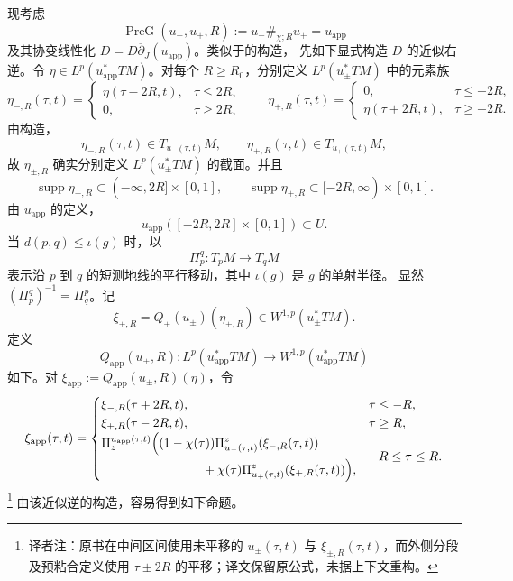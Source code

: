 现考虑\termPreGluingMap{}
\[
 \operatorname{PreG}(u_-,u_+,R):=u_-\#_{\chi;R}u_+=u_{\mathrm{app}}
\]
及其协变线性化 $D=D\overline\partial_J(u_{\mathrm{app}})$。类似于\termApproximateSolution{}的构造，
先如下显式构造 $D$ 的近似右逆。令
$\eta\in L^p(u_{\mathrm{app}}^*TM)$。对每个 $R\geq R_0$，分别定义
$L^p(u_\pm^*TM)$ 中的元素族
\[
 \eta_{-,R}(\tau,t)=
 \begin{cases}
 \eta(\tau-2R,t),&\tau\leq2R,\\
 0,&\tau\geq2R,
 \end{cases}
\qquad
 \eta_{+,R}(\tau,t)=
 \begin{cases}
 0,&\tau\leq-2R,\\
 \eta(\tau+2R,t),&\tau\geq-2R.
 \end{cases}
\]
由构造，
\[
 \eta_{-,R}(\tau,t)\in T_{u_-(\tau,t)}M,
 \qquad
 \eta_{+,R}(\tau,t)\in T_{u_+(\tau,t)}M,
\]
故 $\eta_{\pm,R}$ 确实分别定义 $L^p(u_\pm^*TM)$ 的截面。并且
\begin{equation}
 \operatorname{supp}\eta_{-,R}\subset(-\infty,2R]\times[0,1],
 \qquad
 \operatorname{supp}\eta_{+,R}\subset[-2R,\infty)\times[0,1].
 \label{eq:cutoff-eta-supports}
\end{equation}
由 $u_{\mathrm{app}}$ 的定义，
\[
 u_{\mathrm{app}}([-2R,2R]\times[0,1])\subset U.
\]
当 $d(p,q)\leq\iota(g)$ 时，以
\[
 \Pi_p^q:T_pM\longrightarrow T_qM
\]
表示沿 $p$ 到 $q$ 的短测地线的平行移动，其中 $\iota(g)$ 是 $g$ 的单射半径。
显然 $(\Pi_p^q)^{-1}=\Pi_q^p$。记
\begin{equation}
 \xi_{\pm,R}=Q_\pm(u_\pm)(\eta_{\pm,R})
 \in W^{1,p}(u_\pm^*TM).
 \label{eq:right-inverse-sections-xi}
\end{equation}
定义
\[
 Q_{\mathrm{app}}(u_\pm,R):L^p(u_{\mathrm{app}}^*TM)
 \longrightarrow W^{1,p}(u_{\mathrm{app}}^*TM)
\]
如下。对 $\xi_{\mathrm{app}}:=Q_{\mathrm{app}}(u_\pm,R)(\eta)$，令
\begin{equation}
\xi_{\mathrm{app}}(\tau,t)=
\begin{cases}
 \xi_{-,R}(\tau+2R,t),&\tau\leq-R,\\
 \xi_{+,R}(\tau-2R,t),&\tau\geq R,\\
 \begin{aligned}
 &\Pi_z^{u_{\mathrm{app}}(\tau,t)}\Bigl(
 (1-\chi(\tau))\Pi_{u_-(\tau,t)}^z(\xi_{-,R}(\tau,t))\\
 &\hspace{8em}
 +\chi(\tau)\Pi_{u_+(\tau,t)}^z(\xi_{+,R}(\tau,t))\Bigr),
 \end{aligned}
 &-R\leq\tau\leq R.
\end{cases}
\label{eq:approximate-right-inverse}
\end{equation}
\footnote{译者注：原书在中间区间使用未平移的
$u_\pm(\tau,t)$ 与 $\xi_{\pm,R}(\tau,t)$，而外侧分段及预粘合定义使用
$\tau\pm2R$ 的平移；译文保留原公式，未据上下文重构。}
由该近似逆的构造，容易得到如下命题。

